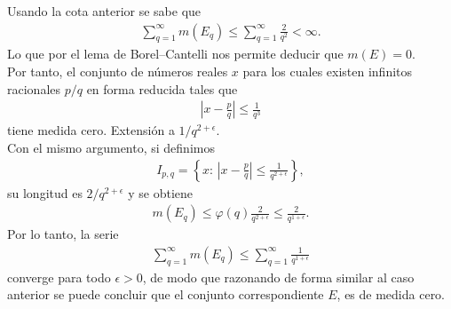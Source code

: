 \begin{solucion}
Usando la cota anterior se sabe que
\begin{align*}
  \sum_{q=1}^{\infty} m(E_q) \leq \sum_{q=1}^{\infty} \frac{2}{q^{2}} <\infty.  
\end{align*}
Lo que por el lema de Borel--Cantelli nos permite deducir que $m(E)=0$.\\
Por tanto, el conjunto de números reales $x$ para los cuales existen infinitos racionales $p/q$ en forma reducida tales que
\begin{align*}
  \left|x-\frac{p}{q}\right|\leq\frac{1}{q^{3}} 
\end{align*}
tiene medida cero.
Extensión a $1/q^{2+\epsilon}$.\\
Con el mismo argumento, si definimos
\begin{align*}
  I_{p,q}=\left\{x:\,\left|x-\frac{p}{q}\right|\leq \frac{1}{q^{2+\epsilon}}\right\},
\end{align*}
su longitud es $2/q^{2+\epsilon}$ y se obtiene
\begin{align*}
  m(E_q)\leq \varphi(q)\frac{2}{q^{2+\epsilon}} \leq \frac{2}{q^{1+\epsilon}}.
\end{align*}
Por lo tanto, la serie
\begin{align*}
  \sum_{q=1}^{\infty}m(E_{q})\leq \sum_{q=1}^{\infty} \frac{1}{q^{1+\epsilon}} 
\end{align*}
  converge para todo $\epsilon>0$, de modo que razonando de forma similar al caso anterior se puede concluir que el conjunto correspondiente $E$, es de medida cero.
\end{solucion}
